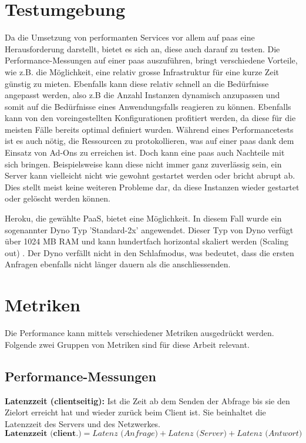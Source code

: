 \documentclass[main.tex]{subfiles}
\begin{document}
\section{Testumgebung}
Da die Umsetzung von performanten Services vor allem auf \acrfull{paas} eine Herausforderung darstellt, bietet es sich an, diese auch darauf zu testen.
Die Performance-Messungen auf einer \acrshort{paas} auszuführen, bringt verschiedene Vorteile, wie z.B. die Möglichkeit, eine relativ grosse Infrastruktur für eine kurze Zeit günstig zu mieten. Ebenfalls kann diese relativ schnell an die Bedürfnisse angepasst werden, also z.B die Anzahl Instanzen dynamisch anzupassen und somit auf die Bedürfnisse eines Anwendungsfalls reagieren zu können. Ebenfalls kann von den voreingestellten Konfigurationen profitiert werden, da diese für die meisten Fälle bereits optimal definiert wurden. Während eines Performancetests ist es auch nötig, die Ressourcen zu protokollieren, was auf einer \acrshort{paas} dank dem Einsatz von Ad-Ons zu erreichen ist. Doch kann eine \acrshort{paas} auch Nachteile mit sich bringen. Beispielsweise kann diese nicht immer ganz zuverlässig sein, ein Server kann vielleicht nicht wie gewohnt gestartet werden oder bricht abrupt ab. Dies stellt meist keine weiteren Probleme dar, da diese Instanzen wieder gestartet oder gelöscht werden können.\cite[Kap.~3]{molyneaux2014art} 


Heroku, die gewählte PaaS, bietet eine Möglichkeit. In diesem Fall wurde ein sogenannter Dyno Typ 'Standard-2x' angewendet. Dieser Typ von Dyno verfügt über 1024 MB RAM und kann hundertfach horizontal skaliert werden (Scaling out) \cite[Kap.~2]{middleton_2014}. Der Dyno verfällt nicht in den Schlafmodus, was bedeutet, dass die ersten Anfragen ebenfalls nicht länger dauern als die anschliessenden. 



\section{Metriken}
Die Performance kann mittels verschiedener Metriken ausgedrückt werden. Folgende zwei Gruppen von Metriken sind für diese Arbeit relevant.

\subsection{Performance-Messungen}

\textbf{Latenzzeit (clientseitig):} Ist die Zeit ab dem Senden der Abfrage bis sie den Zielort erreicht hat und wieder zurück beim Client ist. Sie beinhaltet die Latenzzeit des Servers und des Netzwerkes. 
\begin{equation}
\textbf{Latenzzeit (client.)} = \textit{Latenz (Anfrage)}+\textit{Latenz (Server)}+\textit{Latenz (Antwort)}
\end{equation}
\end{document}
